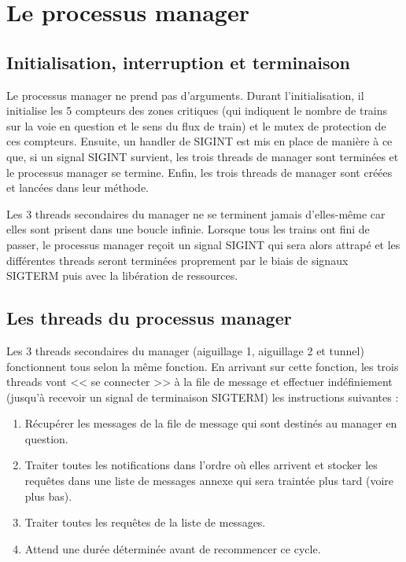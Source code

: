 \documentclass[a4paper,12pt]{article}
\begin{document}
\section{Le processus manager}

\subsection{Initialisation, interruption et terminaison}

Le processus manager ne prend pas d'arguments. Durant l'initialisation, il initialise les 5 compteurs des zones critiques (qui indiquent le nombre de trains sur la voie en question et le sens du flux de train) et le mutex de protection de ces compteurs. Ensuite, un handler de SIGINT est mis en place de manière à ce que, si un signal SIGINT survient, les trois threads de manager sont terminées et le processus manager se termine. Enfin, les trois threads de manager sont créées et lancées dans leur méthode.

Les 3 threads secondaires du manager ne se terminent jamais d'elles-même car elles sont prisent dans une boucle infinie. Lorsque tous les trains ont fini de passer, le processus manager reçoit un signal SIGINT qui sera alors attrapé et les différentes threads seront terminées proprement par le biais de signaux SIGTERM puis avec la libération de ressources.

\subsection{Les threads du processus manager}

Les 3 threads secondaires du manager (aiguillage 1, aiguillage 2 et tunnel) fonctionnent tous selon la même fonction. En arrivant sur cette fonction, les trois threads vont << se connecter >> à la file de message et effectuer indéfiniement (jusqu'à recevoir un signal de terminaison SIGTERM) les instructions suivantes :

\begin{enumerate}
    \item Récupérer les messages de la file de message qui sont destinés au manager en question.
    \item Traiter toutes les notifications dans l'ordre où elles arrivent et stocker les requêtes dans une liste de messages annexe qui sera traintée plus tard (voire plus bas).
    \item Traiter toutes les requêtes de la liste de messages.
    \item Attend une durée déterminée avant de recommencer ce cycle.
\end{enumerate}
\end{document}
